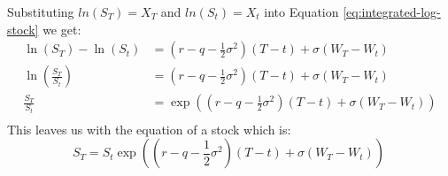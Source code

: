 \documentclass[12pt]{article}
\numberwithin{equation}{section}
\begin{document}
Substituting $ln(S_T) = X_T$ and $ln(S_t) = X_t$ into Equation \ref{eq:integrated-log-stock} we get:
\begin{equation}
	\begin{aligned}
		\ln(S_T)-\ln(S_t)
		&=
		\left(r-q-\frac{1}{2}\sigma^2\right)(T-t)
		+\sigma(W_T-W_t) \\
		\ln\left(\frac{S_T}{S_t}\right)
		&=
		\left(r-q-\frac{1}{2}\sigma^2\right)(T-t)
		+\sigma(W_T-W_t) \\
		\frac{S_T}{S_t}
		&=
		\exp\left(
		\left(r-q-\frac{1}{2}\sigma^2\right)(T-t)
		+\sigma(W_T-W_t)
		\right) \\
	\end{aligned}
\end{equation}
This leaves us with the equation of a stock which is:
\begin{equation}
	S_T = S_t\exp\left(
	\left(r-q-\frac{1}{2}\sigma^2\right)(T-t)
	+\sigma(W_T-W_t)
	\right)
	\
	\label{eq:merton-terminal-stock-price}
\end{equation}
\end{document}
